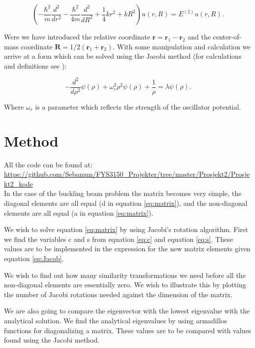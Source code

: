 \documentclass[norsk,a4paper,12pt]{article}
\begin{document}
\begin{equation*}
\left(  -\frac{\hbar^2}{m} \frac{d^2}{dr^2} -\frac{\hbar^2}{4 m} \frac{d^2}{dR^2}+ \frac{1}{4} k r^2+  kR^2\right)u(r,R)  = E^{(2)} u(r,R).
\end{equation*}

Were we have introduced the relative coordinate $\mathbf{r} = \mathbf{r}_1-\mathbf{r}_2$
and the center-of-mass coordinate $\mathbf{R}=1/2(\mathbf{r}_1+\mathbf{r}_2)$. With some manipulation and calculation we arrive at a form which can be solved using the Jacobi method (for calculations and definitions see \cite{94}):

\begin{equation}
  -\frac{d^2}{d\rho^2} \psi(\rho) + \omega_r^2\rho^2\psi(\rho) +\frac{1}{\rho} = \lambda \psi(\rho).
\label{eq:SE}
\end{equation}

Where $\omega_r$ is a parameter which reflects the strength of the oscillator potential.

\section{Method}
All the code can be found at: \\
\url{https://github.com/Sebamun/FYS3150_Projekter/tree/master/Prosjekt2/Prosjekt2_kode}
\\


In the case of the buckling beam problem the matrix becomes very simple, the diagonal elements are all equal (d in equation \ref{eq:matrix}), and the non-diagonal elements are all equal (a in equation \ref{eq:matrix}). 

We wish to solve equation \ref{eq:matrix} by using Jacobi's rotation algorithm. First we find the variables c and s from equation \ref{eq:c} and equation \ref{eq:s}. These values are to be implemented in the expression for the new matrix elements given equation \ref{eq:Jacob}.

We wish to find out how many similarity transformations we need before all the non-diagonal elements are essentially zero. We wish to illustrate this by plotting the number of Jacobi rotations needed against the dimension of the matrix. 

We are also going to compare the eigenvector with the lowest eigenvalue with the analytical solution. We find the analytical eigenvalues by using armadillos functions for diagonalizing a matrix. These values are to be compared with values found using the Jacobi method. 
\end{document}
